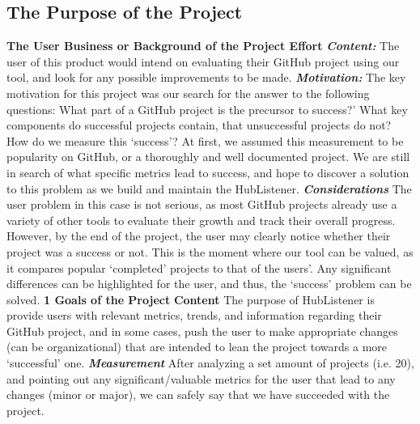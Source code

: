 \documentclass{article}
\begin{document}
\subsection{The Purpose of the Project}
\textbf{The User Business or Background of the Project Effort}
\newline
\textbf{\textit{Content:}} The user of this product would intend on evaluating their GitHub project using our tool, and look for any possible improvements to be made. \newline
\textbf{\textit{Motivation:}}\newline
The key motivation for this project was our search for the answer to the following questions: What part of a GitHub project is the precursor to success?' What key components do successful projects contain, that unsuccessful projects do not? How do we measure this ‘success’? At first, we assumed this measurement to be popularity on GitHub, or a thoroughly and well documented project. We are still in search of what specific metrics lead to success, and hope to discover a solution to this problem as we build and maintain the HubListener.  \newline
\textbf{\textit{Considerations}}
The user problem in this case is not serious, as most GitHub projects already use a variety of other tools to evaluate their growth and track their overall progress. However, by the end of the project, the user may clearly notice whether their project was a success or not. This is the moment where our tool can be valued, as it compares popular ‘completed’ projects to that of the users’. Any significant differences can be highlighted for the user, and thus, the ‘success’ problem can be solved. \newline
\textbf{1 Goals of the Project}
\textbf{Content}\newline
The purpose of HubListener is provide users with relevant metrics, trends, and information regarding their GitHub project, and in some cases, push the user to make appropriate changes (can be organizational) that are intended to lean the project towards a more ‘successful’ one.\newline
\textbf{\textit{Measurement}}
After analyzing a set amount of projects (i.e. 20), and pointing out any significant/valuable metrics for the user that lead to any changes (minor or major), we can safely say that we have succeeded with the project.
\end{document}
